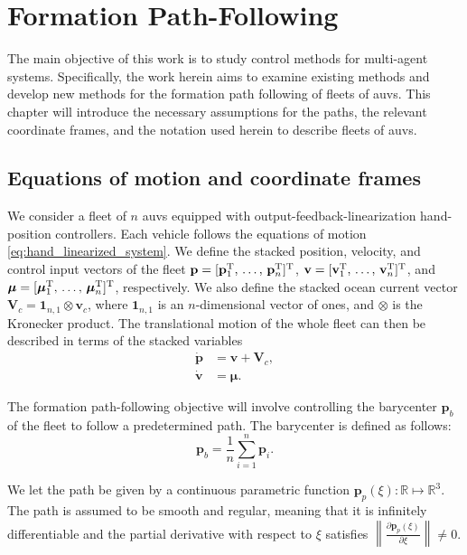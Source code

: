 \chapter{Formation Path-Following}\label{cha:formation_path_following}

The main objective of this work is to study control methods for multi-agent systems. Specifically, the work herein aims to examine existing methods and develop new methods for the formation path following of fleets of \glspl{auv}. This chapter will introduce the necessary assumptions for the paths, the relevant coordinate frames, and the notation used herein to describe fleets of \glspl{auv}.


\section{Equations of motion and coordinate frames}
We consider a fleet of $n$ \glspl{auv} equipped with output-feedback-linearization hand-position controllers. Each vehicle follows the equations of motion \eqref{eq:hand_linearized_system}. We define the stacked position, velocity, and control input vectors of the fleet $\mathbf{p} = [\mathbf{p}_{1}^{\rm T}, \, \ldots,\, \mathbf{p}_{n}^{\rm T}]^{\rm T}$, $\mathbf{v} = [\mathbf{v}_{1}^{\rm T}, \, \ldots,\, \mathbf{v}_{n}^{\rm T}]^{\rm T}$, and $\bm{\mu} = [\bm{\mu}_1^{\rm T}, \, \ldots,\, \bm{\mu}_n^{\rm T}]^{\rm T}$, respectively. We also define the stacked ocean current vector $\mathbf{V}_c = \mathbf{1}_{n,1} \otimes \mathbf{v}_c$, where $\mathbf{1}_{n,1}$ is an $n$-dimensional vector of ones, and $\otimes$ is the Kronecker product. The translational motion of the whole fleet can then be described in terms of the stacked variables
\begin{subequations}\label{eq:fleet_equation}
\begin{align}
    \dot{\mathbf{p}} &= \mathbf{v} + \mathbf{V}_c,\\
    \dot{\mathbf{v}} &= \bm{\mu}.
\end{align}
\end{subequations}

The formation path-following objective will involve controlling the barycenter $\mathbf{p}_b$ of the fleet to follow a predetermined path. The barycenter is defined as follows:
\begin{equation}\label{eq:barycenter}
    \mathbf{p}_b = \frac{1}{n}\sum_{i=1}^n \mathbf{p}_i.
\end{equation}

We let the path be given by a continuous parametric function $\mathbf{p}_p (\xi) : \mathbb{R} \mapsto \mathbb{R}^3$. The path is assumed to be smooth and regular, meaning that it is infinitely differentiable and the partial derivative with respect to $\xi$ satisfies $\left\|\frac{\partial \mathbf{p}_p(\xi)}{\partial \xi}\right\| \neq 0$.

